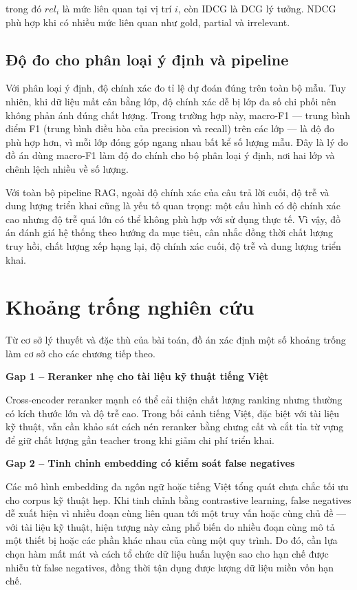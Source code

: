 \documentclass[../DoAn.tex]{subfiles}
\begin{document}
trong đó $rel_i$ là mức liên quan tại vị trí $i$, còn IDCG là DCG lý tưởng. NDCG phù hợp khi có nhiều mức liên quan như gold, partial và irrelevant.

\subsection{Độ đo cho phân loại ý định và pipeline}
\label{subsection:2.7.2}

Với phân loại ý định, độ chính xác đo tỉ lệ dự đoán đúng trên toàn bộ mẫu. Tuy nhiên, khi dữ liệu mất cân bằng lớp, độ chính xác dễ bị lớp đa số chi phối nên không phản ánh đúng chất lượng. Trong trường hợp này, macro-F1 --- trung bình điểm F1 (trung bình điều hòa của precision và recall) trên các lớp --- là độ đo phù hợp hơn, vì mỗi lớp đóng góp ngang nhau bất kể số lượng mẫu. Đây là lý do đồ án dùng macro-F1 làm độ đo chính cho bộ phân loại ý định, nơi hai lớp  và  chênh lệch nhiều về số lượng.

Với toàn bộ pipeline RAG, ngoài độ chính xác của câu trả lời cuối, độ trễ và dung lượng triển khai cũng là yếu tố quan trọng: một cấu hình có độ chính xác cao nhưng độ trễ quá lớn có thể không phù hợp với sử dụng thực tế. Vì vậy, đồ án đánh giá hệ thống theo hướng đa mục tiêu, cân nhắc đồng thời chất lượng truy hồi, chất lượng xếp hạng lại, độ chính xác cuối, độ trễ và dung lượng triển khai.

\section{Khoảng trống nghiên cứu}
\label{section:2.8}

Từ cơ sở lý thuyết và đặc thù của bài toán, đồ án xác định một số khoảng trống làm cơ sở cho các chương tiếp theo.

\noindent\textbf{Gap 1 -- Reranker nhẹ cho tài liệu kỹ thuật tiếng Việt}

Cross-encoder reranker mạnh có thể cải thiện chất lượng ranking nhưng thường có kích thước lớn và độ trễ cao. Trong bối cảnh tiếng Việt, đặc biệt với tài liệu kỹ thuật, vẫn cần khảo sát cách nén reranker bằng chưng cất và cắt tỉa từ vựng để giữ chất lượng gần teacher trong khi giảm chi phí triển khai.

\noindent\textbf{Gap 2 -- Tinh chỉnh embedding có kiểm soát false negatives}

Các mô hình embedding đa ngôn ngữ hoặc tiếng Việt tổng quát chưa chắc tối ưu cho corpus kỹ thuật hẹp. Khi tinh chỉnh bằng contrastive learning, false negatives dễ xuất hiện vì nhiều đoạn cùng liên quan tới một truy vấn hoặc cùng chủ đề --- với tài liệu kỹ thuật, hiện tượng này càng phổ biến do nhiều đoạn cùng mô tả một thiết bị hoặc các phần khác nhau của cùng một quy trình. Do đó, cần lựa chọn hàm mất mát và cách tổ chức dữ liệu huấn luyện sao cho hạn chế được nhiễu từ false negatives, đồng thời tận dụng được lượng dữ liệu miền vốn hạn chế.
\end{document}
